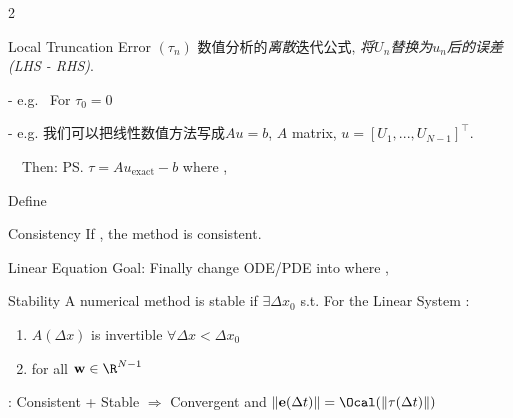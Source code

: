 \documentclass{note}
\begin{document}
\begin{multicols}{2}
{{    \begin{MyTh}{Local Truncation Error $(\tau_n)$}\tiny
        数值分析的\textit{离散}迭代公式, \textit{将$U_n$替换为$u_n$后的误差(LHS - RHS)}.
        
        \qquad - e.g. \ For  \quad $\tau_0=0$

        \qquad - e.g. 我们可以把线性数值方法写成$Au=b$, $A$ matrix, $u=[U_1,...,U_{N-1}]^\top$.

        \qquad\qquad \ \ Then: \ps{$\tau=A u_{\text{exact}}-b$} where , 
        
        \qquad {} \qquad Define 
    \end{MyTh}

    \begin{MyTh}{Consistency}\tiny
        If , the method is consistent.
    \end{MyTh}

    \begin{MyTh}{Linear Equation}\tiny
        Goal: Finally change ODE/PDE into  where , 
    \end{MyTh}

    \begin{MyTh}{Stability} \tiny
        A numerical method is stable if \quad $\exists \Delta x_0$ s.t. For the Linear System :
        \begin{enumerate}
            \item $A(\Delta x)$ is invertible $\forall \Delta x<\Delta x_0$
            \item {} \quad for all $\mathbf{w}\in\R^{N-1}$
        \end{enumerate}
        \quad {}: Consistent + Stable $\Rightarrow$ Convergent  \quad and $\|\mathbf{e}(\Delta t)\|=\Ocal(\|\tau(\Delta t)\|)$
    \end{MyTh}
    }}

\end{multicols}
\end{document}
